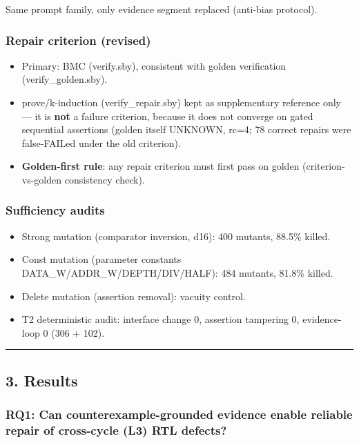 \documentclass[
  11pt,
]{article}
\providecommand{\tightlist}{%
  \setlength{\itemsep}{0pt}\setlength{\parskip}{0pt}}
\begin{document}
Same prompt family, only evidence segment replaced (anti-bias protocol).

\subsubsection{Repair criterion (revised)}\label{repair-criterion-revised}

\begin{itemize}
\tightlist
\item
  Primary: BMC (verify.sby), consistent with golden verification (verify\_golden.sby).
\item
  prove/k-induction (verify\_repair.sby) kept as supplementary reference only --- it is \textbf{not} a failure criterion, because it does not converge on gated sequential assertions (golden itself UNKNOWN, rc=4; 78 correct repairs were false-FAILed under the old criterion).
\item
  \textbf{Golden-first rule}: any repair criterion must first pass on golden (criterion-vs-golden consistency check).
\end{itemize}

\subsubsection{Sufficiency audits}\label{sufficiency-audits}

\begin{itemize}
\tightlist
\item
  Strong mutation (comparator inversion, d16): 400 mutants, 88.5\% killed.
\item
  Const mutation (parameter constants DATA\_W/ADDR\_W/DEPTH/DIV/HALF): 484 mutants, 81.8\% killed.
\item
  Delete mutation (assertion removal): vacuity control.
\item
  T2 deterministic audit: interface change 0, assertion tampering 0, evidence-loop 0 (306 + 102).
\end{itemize}

\begin{center}\rule{0.5\linewidth}{0.5pt}\end{center}

\subsection{3. Results}\label{results}

\subsubsection{RQ1: Can counterexample-grounded evidence enable reliable repair of cross-cycle (L3) RTL defects?}\label{rq1-can-counterexample-grounded-evidence-enable-reliable-repair-of-cross-cycle-l3-rtl-defects}
\end{document}
